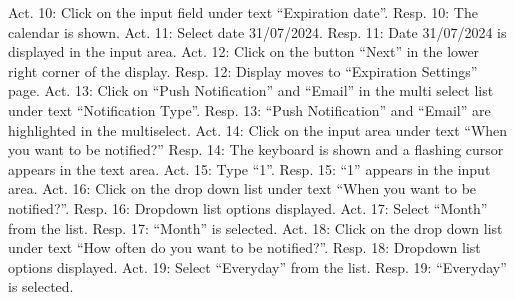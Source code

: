 Act. 10: Click on the input field under text “Expiration date”.\newline
Resp. 10: The calendar is shown.\newline\newline
Act. 11: Select date 31/07/2024.\newline
Resp. 11: Date 31/07/2024 is displayed in the input area.\newline\newline
Act. 12: Click on the button “Next” in the lower right corner of the display.\newline
Resp. 12: Display moves to “Expiration Settings” page.\newline\newline
Act. 13: Click on “Push Notification” and “Email” in the multi select list under text
“Notification Type”.\newline
Resp. 13: “Push Notification” and “Email” are highlighted in the multiselect.\newline\newline
Act. 14: Click on the input area under text “When you want to be notified?”\newline
Resp. 14: The keyboard is shown and a flashing cursor appears in the text area.\newline\newline\newline
Act. 15: Type “1”.\newline
Resp. 15: “1” appears in the input area.\newline\newline
Act. 16: Click on the drop down list under text “When you want to be notified?”.\newline
Resp. 16: Dropdown list options displayed.\newline\newline
Act. 17: Select “Month” from the list.\newline
Resp. 17: “Month” is selected.\newline\newline
Act. 18: Click on the drop down list under text “How often do you want to be notified?”.\newline
Resp. 18: Dropdown list options displayed.\newline\newline
Act. 19: Select “Everyday” from the list.\newline
Resp. 19: “Everyday” is selected.\newline\newline
